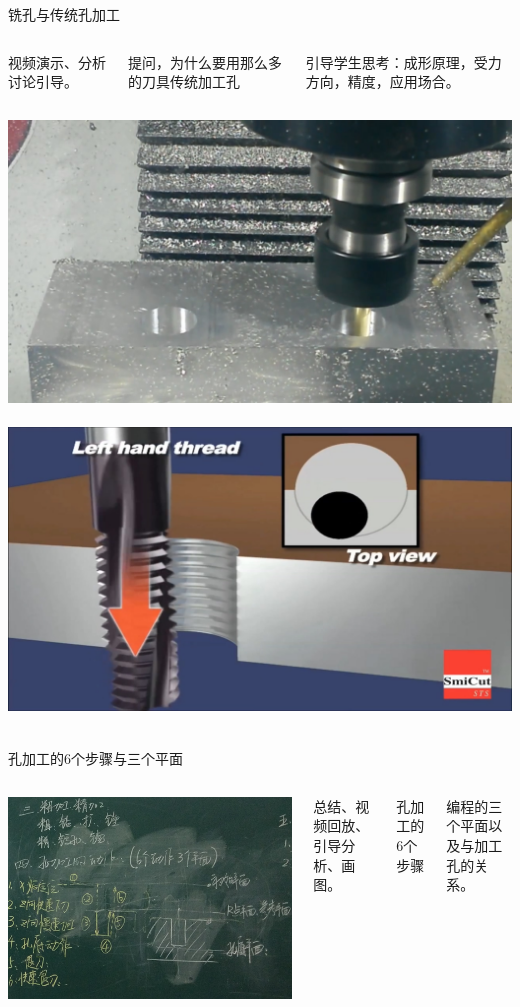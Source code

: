 \documentclass[utf8,zihao=-4,handout,smaller,aspectratio=1610]{ctexbeamer}
\begin{document}
\begin{frame}{铣孔与传统孔加工}
	\begin{columns}
		\column{\textwidth}
		
		视频演示、分析讨论引导。
		
		提问，为什么要用那么多的刀具传统加工孔
		
		引导学生思考：成形原理，受力方向，精度，应用场合。
	\end{columns}
\includegraphics[width=.5\linewidth,trim=0 0 0  0,clip,angle=0]{image/2-1.jpg}~
\includegraphics[width=.5\linewidth,trim=0 0 0  0,clip,angle=0]{image/xiluowen2.jpg}~

\end{frame}

\begin{frame}{孔加工的6个步骤与三个平面}
	\begin{columns}
		\column{.5\textwidth}
				\includegraphics[width=\linewidth,trim=0 0 0 0 ,clip,angle=0]{image/44.jpg}~
		\column{.5\textwidth}
		
		总结、视频回放、引导分析、画图。
		
		孔加工的6个步骤
		
		编程的三个平面以及与加工孔的关系。
		
		\column{0\textwidth}
	\end{columns}
\end{frame}
\end{document}
